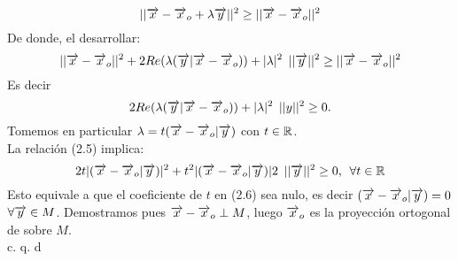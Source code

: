 $$
||  \overrightarrow{x}- \overrightarrow{x}_o+\lambda \overrightarrow{y}||^2 \geq ||  \overrightarrow{x}-\overrightarrow{x}_o ||^2
$$
De donde, el desarrollar: \\
$$|| \overrightarrow{x}-\overrightarrow{x}_o||^2 +2Re(\lambda (\overrightarrow{y}|\overrightarrow{x}-\overrightarrow{x}_o))+|\lambda|^2 \phantom{s} || \overrightarrow{y}||^2 \geq || \overrightarrow{x} -\overrightarrow{x}_o ||^2
$$
Es decir
\begin{equation}
2Re(\lambda(\overrightarrow{y}|\overrightarrow{x}-\overrightarrow{x}_o))+|\lambda|^2 \phantom{s}|| y||^2 \geq 0. 
\end{equation}
Tomemos en particular $\lambda=t(\overrightarrow{x}-\overrightarrow{x}_o|\overrightarrow{y})$ con $t\in \mathbb{R}$. \\
La relación (2.5) implica: \\
\begin{equation}
2t | (\overrightarrow{x}-\overrightarrow{x}_o|\overrightarrow{y})|^2+t^2|(\overrightarrow{x}-\overrightarrow{x}_o|\overrightarrow{y})|2 \phantom{s} || \overrightarrow{y} ||^2 \geq 0, \phantom{s} \forall t \in \mathbb{R}
\end{equation}
Esto equivale a que el coeficiente de $t$ en (2.6) sea nulo, es decir $(\overrightarrow{x}-\overrightarrow{x}_o|\overrightarrow{y})=0$ $\forall \overrightarrow{y} \in M$. Demostramos pues $\overrightarrow{x}-\overrightarrow{x}_o\perp M$, luego $\overrightarrow{x}_o$ es la proyección ortogonal de \xraya \phantom{} sobre $M$.\\
\phantom{sssssssssssssssssssssssssssssssssss sasdasdasdasdadadssada} c. q. d
\\

